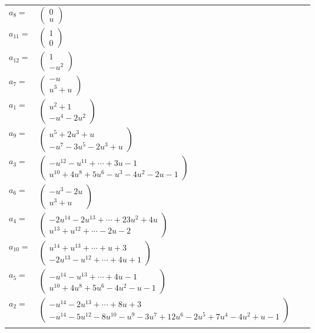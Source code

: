 \documentclass[1p]{elsarticle_modified}
\theoremstyle{definition}
\begin{document}
\begin{tabular}{m{7pt} m{180pt} m{7pt} m{180pt} }
\flushright $a_{8}=$&$\begin{pmatrix}0\\u\end{pmatrix}$ \\
\flushright $a_{11}=$&$\begin{pmatrix}1\\0\end{pmatrix}$ \\
\flushright $a_{12}=$&$\begin{pmatrix}1\\- u^2\end{pmatrix}$ \\
\flushright $a_{7}=$&$\begin{pmatrix}- u\\u^3+u\end{pmatrix}$ \\
\flushright $a_{1}=$&$\begin{pmatrix}u^2+1\\- u^4-2 u^2\end{pmatrix}$ \\
\flushright $a_{9}=$&$\begin{pmatrix}u^5+2 u^3+u\\- u^7-3 u^5-2 u^3+u\end{pmatrix}$ \\
\flushright $a_{3}=$&$\begin{pmatrix}- u^{12}- u^{11}+\cdots+3 u-1\\u^{10}+4 u^8+5 u^6- u^3-4 u^2-2 u-1\end{pmatrix}$ \\
\flushright $a_{6}=$&$\begin{pmatrix}- u^3-2 u\\u^3+u\end{pmatrix}$ \\
\flushright $a_{4}=$&$\begin{pmatrix}-2 u^{14}-2 u^{13}+\cdots+23 u^2+4 u\\u^{13}+u^{12}+\cdots-2 u-2\end{pmatrix}$ \\
\flushright $a_{10}=$&$\begin{pmatrix}u^{14}+u^{13}+\cdots+u+3\\-2 u^{13}- u^{12}+\cdots+4 u+1\end{pmatrix}$ \\
\flushright $a_{5}=$&$\begin{pmatrix}- u^{14}- u^{13}+\cdots+4 u-1\\u^{10}+4 u^8+5 u^6-4 u^2- u-1\end{pmatrix}$ \\
\flushright $a_{2}=$&$\begin{pmatrix}- u^{14}-2 u^{13}+\cdots+8 u+3\\- u^{14}-5 u^{12}-8 u^{10}- u^9-3 u^7+12 u^6-2 u^5+7 u^4-4 u^2+u-1\end{pmatrix}$\\&\end{tabular}
\end{document}
